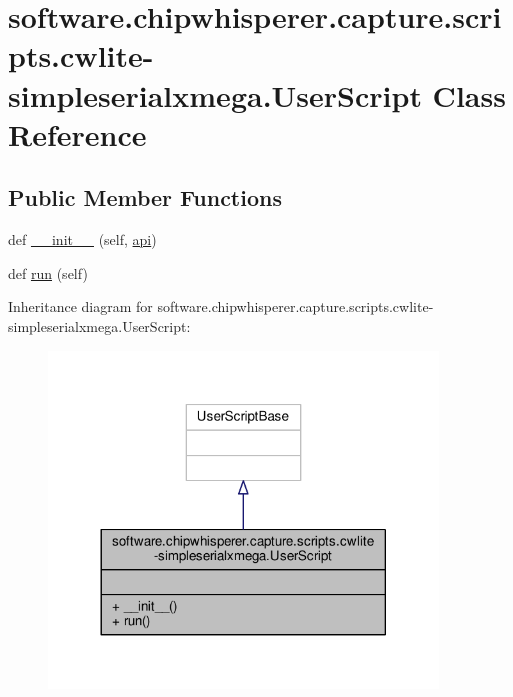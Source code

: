 \hypertarget{classsoftware_1_1chipwhisperer_1_1capture_1_1scripts_1_1cwlite-simpleserialxmega_1_1UserScript}{}\section{software.\+chipwhisperer.\+capture.\+scripts.\+cwlite-\/simpleserialxmega.User\+Script Class Reference}
\label{classsoftware_1_1chipwhisperer_1_1capture_1_1scripts_1_1cwlite-simpleserialxmega_1_1UserScript}
\subsection*{Public Member Functions}
\begin{DoxyCompactItemize}
\item 
def \hyperlink{classsoftware_1_1chipwhisperer_1_1capture_1_1scripts_1_1cwlite-simpleserialxmega_1_1UserScript_ade43da1e80aa4c83d310e4c3de546d7a}{\+\_\+\+\_\+init\+\_\+\+\_\+} (self, \hyperlink{namespacesoftware_1_1chipwhisperer_1_1capture_1_1scripts_1_1cwlite-simpleserialxmega_ad9f99e430f83981fab58150708526ef5}{api})
\item 
def \hyperlink{classsoftware_1_1chipwhisperer_1_1capture_1_1scripts_1_1cwlite-simpleserialxmega_1_1UserScript_a2a474f622cc6dabb5c18ff0413404cca}{run} (self)
\end{DoxyCompactItemize}


Inheritance diagram for software.\+chipwhisperer.\+capture.\+scripts.\+cwlite-\/simpleserialxmega.User\+Script\+:\nopagebreak
\begin{figure}[H]
\begin{center}
\leavevmode
\includegraphics[width=293pt]{da/dec/classsoftware_1_1chipwhisperer_1_1capture_1_1scripts_1_1cwlite-simpleserialxmega_1_1UserScript__inherit__graph}
\end{center}
\end{figure}


